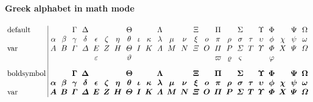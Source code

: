 \paragraph*{Greek alphabet in math mode}
\begin{align*}
 \arraycolsep=2.5pt
 \begin{array}{l|cccccccccccccccccccccccc}
  \text{default} &
   &  & \Gamma & \Delta &  &  &  & \Theta & & & \Lambda & & & \Xi & & \Pi & & \Sigma & & \Upsilon & \Phi & & \Psi & \Omega \\
  \text{} &
  \alpha & \beta & \gamma & \delta & \epsilon & \zeta & \eta & \theta & \iota & \kappa & \lambda & \mu & \nu & \xi & o & \pi & \rho & \sigma & \tau & \upsilon & \phi & \chi & \psi & \omega \\
  \text{var} &
  A & B & \varGamma & \varDelta & E & Z & H & \varTheta & I & K & \varLambda & M & N & \varXi & O & \varPi & P & \varSigma & T & \varUpsilon & \varPhi & X & \varPsi & \varOmega \\
  \text{} &
   & & & & \varepsilon & & & \vartheta &  &  &  &  &  &  & & \varpi & \varrho & \varsigma & & & \varphi & & & \\[2ex]
  \text{boldsymbol} &
   & & \boldsymbol{\Gamma} & \boldsymbol{\Delta} & & & & \boldsymbol{\Theta} &  & & \boldsymbol{\Lambda} &  &  & \boldsymbol{\Xi} & & \boldsymbol{\Pi} & & \boldsymbol{\Sigma} & & \boldsymbol{\Upsilon} & \boldsymbol{\Phi} &  & \boldsymbol{\Psi} & \boldsymbol{\Omega} \\
  \text{} &
  \boldsymbol{\alpha} & \boldsymbol{\beta} & \boldsymbol{\gamma} & \boldsymbol{\delta} & \boldsymbol{\epsilon} & \boldsymbol{\zeta} & \boldsymbol{\eta} & \boldsymbol{\theta} & \boldsymbol{\iota} & \boldsymbol{\kappa} & \boldsymbol{\lambda} & \boldsymbol{\mu} & \boldsymbol{\nu} & \boldsymbol{\xi} & \boldsymbol{o} & \boldsymbol{\pi} & \boldsymbol{\rho} & \boldsymbol{\sigma} & \boldsymbol{\tau} & \boldsymbol{\upsilon} & \boldsymbol{\phi} & \boldsymbol{\chi} & \boldsymbol{\psi} & \boldsymbol{\omega} \\
  \text{var} &
  \boldsymbol{A} & \boldsymbol{B} & \boldsymbol{\varGamma} & \boldsymbol{\varDelta} & \boldsymbol{E} & \boldsymbol{Z} & \boldsymbol{H} & \boldsymbol{\varTheta} & \boldsymbol{I} & \boldsymbol{K} & \boldsymbol{\varLambda} & \boldsymbol{M} & \boldsymbol{N} & \boldsymbol{\varXi} & \boldsymbol{O} & \boldsymbol{\varPi} & \boldsymbol{P} & \boldsymbol{\varSigma} & \boldsymbol{T} & \boldsymbol{\varUpsilon} & \boldsymbol{\varPhi} & \boldsymbol{X} & \boldsymbol{\varPsi} & \boldsymbol{\varOmega} \\

\end{array}
\end{align*}
